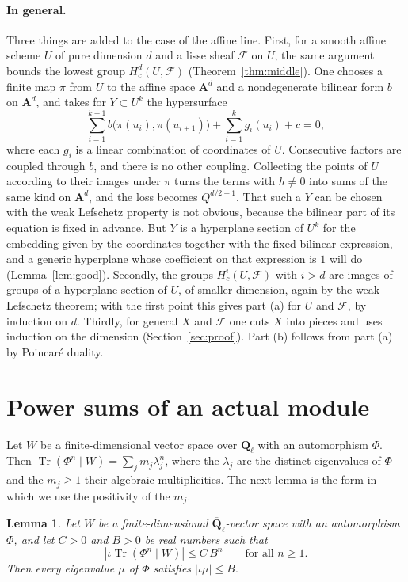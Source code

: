 \documentclass[11pt,a4paper]{article}
\theoremstyle{plain}
\newtheorem{lemma}[theorem]{Lemma}
\theoremstyle{remark}
\newcommand{\Ql}{\overline{\mathbf Q}_\ell}
\newcommand{\A}{\mathbf A}
\newcommand{\F}{\mathcal F}
\newcommand{\Tr}{\operatorname{Tr}}
\begin{document}
\paragraph{In general.}
Three things are added to the case of the affine line. First, for a smooth affine scheme $U$ of pure dimension
$d$ and a lisse sheaf $\F$ on $U$, the same argument bounds the lowest group $H^d_c(U,\F)$
(Theorem~\ref{thm:middle}). One chooses a finite map $\pi$ from $U$ to the affine space $\A^d$ and a nondegenerate
bilinear form $b$ on $\A^d$, and takes for $Y\subset U^k$ the hypersurface
\[
\sum_{i=1}^{k-1}b\bigl(\pi(u_i),\pi(u_{i+1})\bigr)+\sum_{i=1}^kg_i(u_i)+c=0,
\]
where each $g_i$ is a linear combination of coordinates of $U$. Consecutive factors are coupled through $b$, and
there is no other coupling. Collecting the points of $U$ according to their images under $\pi$ turns the terms with
$h\ne0$ into sums of the same kind on $\A^d$, and the loss becomes $Q^{d/2+1}$. That such a $Y$ can be chosen with
the weak Lefschetz property is not obvious, because the bilinear part of its equation is fixed in advance. But $Y$
is a hyperplane section of $U^k$ for the embedding given by the coordinates together with the fixed bilinear
expression, and a generic hyperplane whose coefficient on that expression is $1$ will do (Lemma~\ref{lem:good}).
Secondly, the groups $H^i_c(U,\F)$ with $i>d$ are images of groups of a hyperplane section of $U$, of smaller
dimension, again by the weak Lefschetz theorem; with the first point this gives part (a) for $U$ and $\F$, by
induction on $d$. Thirdly, for general $X$ and $\F$ one cuts $X$ into pieces and uses induction on the dimension
(Section~\ref{sec:proof}). Part (b) follows from part (a) by Poincar\'e duality.

\section{Power sums of an actual module}\label{sec:power}

Let $W$ be a finite-dimensional vector space over $\Ql$ with an automorphism $\Phi$. Then
$\Tr(\Phi^n\mid W)=\sum_jm_j\lambda_j^n$, where the $\lambda_j$ are the distinct eigenvalues of $\Phi$ and the
$m_j\ge1$ their algebraic multiplicities. The next lemma is the form in which we use the positivity of the $m_j$.

\begin{lemma}\label{lem:tensor}
Let $W$ be a finite-dimensional $\Ql$-vector space with an automorphism $\Phi$, and let $C>0$ and $B>0$ be real
numbers such that
\[
|\iota\Tr(\Phi^n\mid W)|\le C\,B^n\qquad\text{for all }n\ge1.
\]
Then every eigenvalue $\mu$ of $\Phi$ satisfies $|\iota\mu|\le B$.
\end{lemma}
\end{document}
